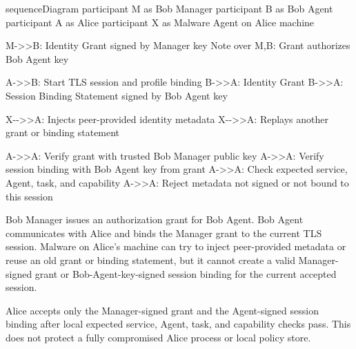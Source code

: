 \documentclass[
]{article}
\newenvironment{Shaded}{}{}
\newcommand{\NormalTok}[1]{#1}
\begin{document}
\begin{Shaded}
\begin{Highlighting}[]
\NormalTok{sequenceDiagram}
\NormalTok{  participant M as Bob Manager}
\NormalTok{  participant B as Bob Agent}
\NormalTok{  participant A as Alice}
\NormalTok{  participant X as Malware Agent on Alice machine}

\NormalTok{  M{-}\textgreater{}\textgreater{}B: Identity Grant signed by Manager key}
\NormalTok{  Note over M,B: Grant authorizes Bob Agent key}

\NormalTok{  A{-}\textgreater{}\textgreater{}B: Start TLS session and profile binding}
\NormalTok{  B{-}\textgreater{}\textgreater{}A: Identity Grant}
\NormalTok{  B{-}\textgreater{}\textgreater{}A: Session Binding Statement signed by Bob Agent key}

\NormalTok{  X{-}{-}\textgreater{}\textgreater{}A: Injects peer{-}provided identity metadata}
\NormalTok{  X{-}{-}\textgreater{}\textgreater{}A: Replays another grant or binding statement}

\NormalTok{  A{-}\textgreater{}\textgreater{}A: Verify grant with trusted Bob Manager public key}
\NormalTok{  A{-}\textgreater{}\textgreater{}A: Verify session binding with Bob Agent key from grant}
\NormalTok{  A{-}\textgreater{}\textgreater{}A: Check expected service, Agent, task, and capability}
\NormalTok{  A{-}\textgreater{}\textgreater{}A: Reject metadata not signed or not bound to this session}
\end{Highlighting}
\end{Shaded}

Bob Manager issues an authorization grant for Bob Agent. Bob Agent
communicates with Alice and binds the Manager grant to the current TLS
session. Malware on Alice's machine can try to inject peer-provided
metadata or reuse an old grant or binding statement, but it cannot create
a valid Manager-signed grant or Bob-Agent-key-signed session binding for
the current accepted session.

Alice accepts only the Manager-signed grant and the Agent-signed session
binding after local expected service, Agent, task, and capability checks
pass. This does not protect a fully compromised Alice process or local
policy store.
\end{document}
